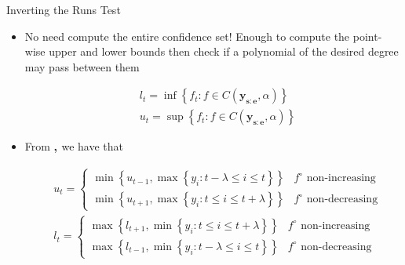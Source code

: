 \documentclass{beamer}
\begin{document}
\begin{frame}{Inverting the Runs Test}

\begin{itemize}[<+->]
\item No need compute the entire confidence set! Enough to compute the point-wise upper and lower bounds then check if a polynomial of the desired degree may pass between them

\begin{align*}
	& l_t = \inf \left \{ f_t : f \in C \left ( \mathbf{y_{s:e}} , \alpha \right ) \right \} \\
	& u_t = \sup \left \{ f_t : f \in C \left ( \mathbf{y_{s:e}} , \alpha \right ) \right \}
\end{align*}

\item From \textbf{\cite{davies1995data}, \cite{davies2001local}} we have that

\begin{align*}
	& u_t = \left\{\begin{matrix}
\min \left \{ u_{t-1}, \max \left \{ y_i : t-\lambda \leq i \leq t \right \}  \right \} & f^\circ \text{  non-increasing}\\
\min \left \{ u_{t+1}, \max \left \{ y_i : t \leq i \leq t + \lambda \right \} \right \} & f^\circ \text{  non-decreasing}
\end{matrix}\right. \\
	& l_t = \left\{\begin{matrix}
\max \left \{ l_{t+1}, \min \left \{ y_i : t \leq i \leq t + \lambda \right \} \right \} & f^\circ \text{  non-increasing} \\
\max \left \{ l_{t-1}, \min \left \{ y_i : t - \lambda \leq i \leq t \right \} \right \} & f^\circ \text{  non-decreasing}
\end{matrix}\right.
\end{align*} \\
\end{itemize}

\end{frame}
\end{document}

